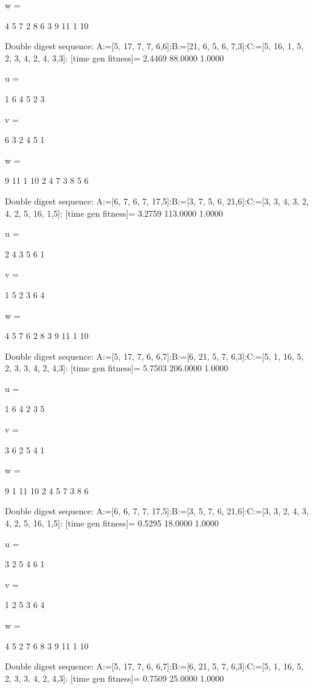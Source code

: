 w =

     4     5     7     2     8     6     3     9    11     1    10

Double digest sequence:
A:=[5, 17, 7, 7, 6,6]:B:=[21, 6, 5, 6, 7,3]:C:=[5, 16, 1, 5, 2, 3, 4, 2, 4, 3,3]:
[time gen fitness]=
    2.4469   88.0000    1.0000


u =

     1     6     4     5     2     3


v =

     6     3     2     4     5     1


w =

     9    11     1    10     2     4     7     3     8     5     6

Double digest sequence:
A:=[6, 7, 6, 7, 17,5]:B:=[3, 7, 5, 6, 21,6]:C:=[3, 3, 4, 3, 2, 4, 2, 5, 16, 1,5]:
[time gen fitness]=
    3.2759  113.0000    1.0000


u =

     2     4     3     5     6     1


v =

     1     5     2     3     6     4


w =

     4     5     7     6     2     8     3     9    11     1    10

Double digest sequence:
A:=[5, 17, 7, 6, 6,7]:B:=[6, 21, 5, 7, 6,3]:C:=[5, 1, 16, 5, 2, 3, 3, 4, 2, 4,3]:
[time gen fitness]=
    5.7503  206.0000    1.0000


u =

     1     6     4     2     3     5


v =

     3     6     2     5     4     1


w =

     9     1    11    10     2     4     5     7     3     8     6

Double digest sequence:
A:=[6, 6, 7, 7, 17,5]:B:=[3, 5, 7, 6, 21,6]:C:=[3, 3, 2, 4, 3, 4, 2, 5, 16, 1,5]:
[time gen fitness]=
    0.5295   18.0000    1.0000


u =

     3     2     5     4     6     1


v =

     1     2     5     3     6     4


w =

     4     5     2     7     6     8     3     9    11     1    10

Double digest sequence:
A:=[5, 17, 7, 6, 6,7]:B:=[6, 21, 5, 7, 6,3]:C:=[5, 1, 16, 5, 2, 3, 3, 4, 2, 4,3]:
[time gen fitness]=
    0.7509   25.0000    1.0000



